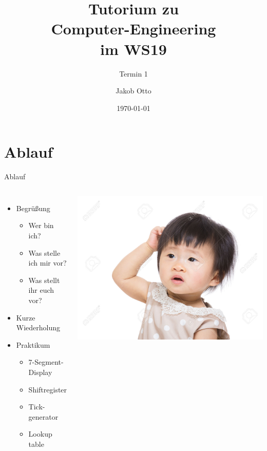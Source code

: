 \documentclass[aspectratio=169,presentation]{beamer}
\date{\today}
\newcommand{\terminNummer}{1}
\begin{document}
	\title[CE Tutorium]{Tutorium zu\\Computer-Engineering\\im WS19}
	\subtitle{Termin \terminNummer}
	\author[Otto]{Jakob Otto}
	\subject{CE Tutorium}
	
	\begin{frame}
		\titlepage
	\end{frame}

\section{Ablauf}
\begin{frame}{Ablauf}
	\begin{columns}
    \begin{itemize}
      \item Begrüßung
      \begin{itemize}
        \item Wer bin ich?
        \item Was stelle ich mir vor?
        \item Was stellt ihr euch vor?
      \end{itemize}
      \item Kurze Wiederholung
      \item Praktikum
      \begin{itemize}
        \item 7-Segment-Display
        \item Shiftregister
        \item Tick-generator
        \item Lookup table
      \end{itemize}

    \end{itemize}
      \begin{center}
        \includegraphics[width=.6\textwidth]{figs/kratzen}
      \end{center}
	\end{columns}
\end{frame}
\end{document}
